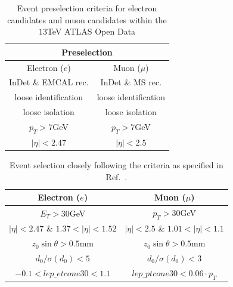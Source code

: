 \documentclass[12pt,a4paper]{amsart}
\begin{document}
\begin{table}[]
\caption{Event preselection criteria for electron candidates and muon candidates within the $13$TeV ATLAS Open Data}
\label{tab:event_preselection}
\begin{tabular}{cc}
\hline\hline
\multicolumn{2}{c}{Preselection}            \\ \hline
Electron ($e$)       & Muon ($\mu$)         \\ \hline
InDet \& EMCAL rec.  & InDet \& MS rec.     \\
loose identification & loose identification \\
loose isolation      & loose isolation      \\
$p_T > 7$GeV         & $p_T > 7$GeV         \\
$|\eta| < 2.47$      & $|\eta| < 2.5$      \\ \hline\hline
\end{tabular}
\end{table}

\begin{table}[]
\caption{Event selection closely following the criteria as specified in Ref.~\cite{dilepton_selection}.}
\label{tab:event_selection}
\begin{tabular}{c|c}
\hline\hline
Electron ($e$)                            & Muon ($\mu$)                            \\ \hline
$E_T > 30$GeV                             & $p_T > 30$GeV                           \\
$|\eta| < 2.47$ \& $1.37 < |\eta| < 1.52$ & $|\eta| < 2.5$ \& $1.01 < |\eta| < 1.1$ \\
$z_0\sin\theta>0.5$mm                     & $z_0\sin\theta > 0.5$mm                 \\
$d_0/\sigma(d_0) < 5$                     & $d_0/\sigma(d_0) < 3$                   \\
$-0.1 < lep\_etcone30 < 1.1$               & $lep\_ptcone30 < 0.06\cdot p_T$               \\ \hline\hline
\end{tabular}
\end{table}
\end{document}
